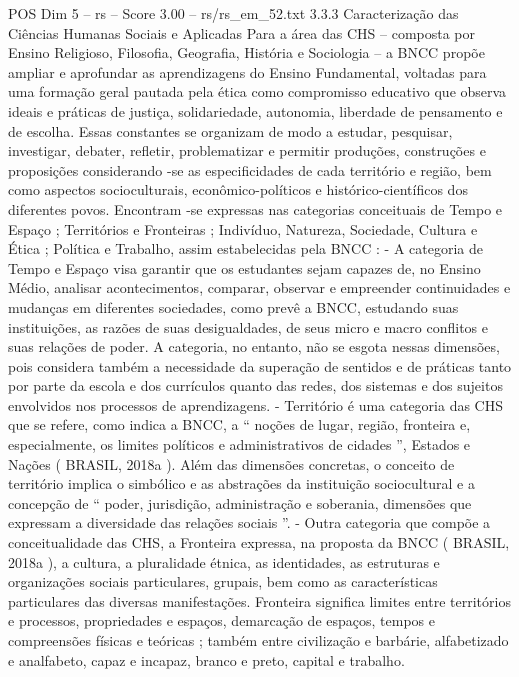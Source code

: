 \begin{textsample}{POS Dim 5 – rs – Score 3.00 – rs/rs\_em\_52.txt}  \label{ex:f5_pos_270}
3.3.3 Caracterização das Ciências Humanas Sociais e Aplicadas Para a área das CHS – composta por Ensino Religioso, Filosofia, Geografia, História e Sociologia – a BNCC propõe ampliar e aprofundar as aprendizagens do Ensino Fundamental, voltadas para uma formação geral pautada pela ética como compromisso educativo que observa ideais e práticas de justiça, solidariedade, autonomia, liberdade de pensamento e de escolha.
Essas constantes se organizam de modo a estudar, pesquisar, investigar, debater, refletir, problematizar e permitir produções, construções e proposições considerando -se as especificidades de cada território e região, bem como aspectos socioculturais, econômico-políticos e histórico-científicos dos diferentes povos.
Encontram -se expressas nas categorias conceituais de Tempo e Espaço ; Territórios e Fronteiras ; Indivíduo, Natureza, Sociedade, Cultura e Ética ; Política e Trabalho, assim estabelecidas pela BNCC : - A categoria de Tempo e Espaço visa garantir que os estudantes sejam capazes de, no Ensino Médio, analisar acontecimentos, comparar, observar e empreender continuidades e mudanças em diferentes sociedades, como prevê a BNCC, estudando suas instituições, as razões de suas desigualdades, de seus micro e macro conflitos e suas relações de poder.
A categoria, no entanto, não se esgota nessas dimensões, pois considera também a necessidade da superação de sentidos e de práticas tanto por parte da escola e dos currículos quanto das redes, dos sistemas e dos sujeitos envolvidos nos processos de aprendizagens. - Território é uma categoria das CHS que se refere, como indica a BNCC, a “ noções de lugar, região, fronteira e, especialmente, os limites políticos e administrativos de cidades ”, Estados e Nações ( BRASIL, 2018a ).
Além das dimensões concretas, o conceito de território implica o simbólico e as abstrações da instituição sociocultural e a concepção de “ poder, jurisdição, administração e soberania, dimensões que expressam a diversidade das relações sociais ”. - Outra categoria que compõe a conceitualidade das CHS, a Fronteira expressa, na proposta da BNCC ( BRASIL, 2018a ), a cultura, a pluralidade étnica, as identidades, as estruturas e organizações sociais particulares, grupais, bem como as características particulares das diversas manifestações.
Fronteira significa limites entre territórios e processos, propriedades e espaços, demarcação de espaços, tempos e compreensões físicas e teóricas ; também entre civilização e barbárie, alfabetizado e analfabeto, capaz e incapaz, branco e preto, capital e trabalho.

\end{textsample}
